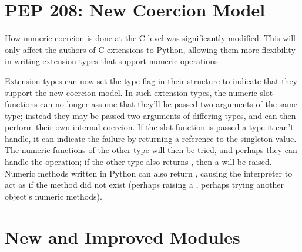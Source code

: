 \documentclass{howto}
\begin{document}
\begin{seealso}


\end{seealso}

\section{PEP 208: New Coercion Model}

How numeric coercion is done at the C level was significantly
modified.  This will only affect the authors of C extensions to
Python, allowing them more flexibility in writing extension types that
support numeric operations.

Extension types can now set the type flag 
in their  structure to indicate that they support
the new coercion model.  In such extension types, the numeric slot
functions can no longer assume that they'll be passed two arguments of
the same type; instead they may be passed two arguments of differing
types, and can then perform their own internal coercion.  If the slot
function is passed a type it can't handle, it can indicate the failure
by returning a reference to the  singleton
value.  The numeric functions of the other type will then be tried,
and perhaps they can handle the operation; if the other type also
returns , then a  will be
raised.  Numeric methods written in Python can also return
, causing the interpreter to act as if the
method did not exist (perhaps raising a , perhaps
trying another object's numeric methods).

\begin{seealso}


\end{seealso}

\section{New and Improved Modules}
\end{document}
